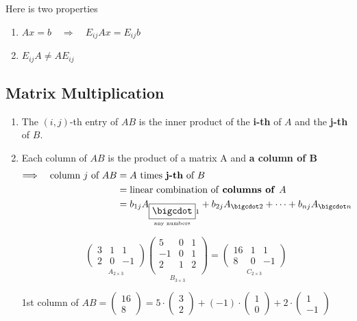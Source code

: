 \begin{note}
Here is two properties
    \begin{enumerate}
        \item $Ax=b \quad \Longrightarrow \quad E_{ij} Ax = E_{ij} b$
        \item $E_{ij}A \neq AE_{ij}$
    \end{enumerate}
\end{note}

\subsection{Matrix Multiplication}
\begin{enumerate}[label=(\arabic*)]
    \item The $(i, j)$-th entry of $AB$ is the inner product of the \textbf{i-th} of $A$ and the \textbf{j-th} of $B$.

    \item Each column of $AB$ is the product of a matrix A and \textbf{a column of B}
    \begin{align*}
        \Longrightarrow \quad \text{column}\ j \ \text{of } AB &= A \text{ times \textbf{j-th} of }B \\
        &= \text{linear combination of \textbf{columns of }}A\\
        &= b_{1j}A_{\underset{\text{any numbers}}{\boxed{\bigcdot}}1} + b_{2j}A_{\bigcdot2} + \cdots + b_{nj}A_{\bigcdot n}
    \end{align*}
    \begin{eg}
    \[
    \underset{A_{2\times3}}{\left(
    \begin{matrix}
    3 & 1 & 1 \\
    2 & 0 & -1
    \end{matrix}
    \right)}\underset{B_{3\times3}}{\left(
    \begin{matrix}
    5 & 0 & 1 \\
    -1 & 0 & 1 \\
    2 & 1 & 2 \\
    \end{matrix}
    \right)} = \underset{C_{2\times3}}{\left(
    \begin{matrix}
    16 & 1 & 1 \\
    8 & 0 & -1
    \end{matrix}
    \right)}
    \]
    
    
    \end{eg}
    1st column of $AB = \left(
    \begin{matrix}
    16 \\ 8
    \end{matrix}
    \right) = 5\cdot\left(
    \begin{matrix}
    3 \\ 2
    \end{matrix}
    \right)+(-1)\cdot\left(
    \begin{matrix}
    1 \\ 0
    \end{matrix}
    \right)+2\cdot\left(
    \begin{matrix}
    1 \\ -1
    \end{matrix}
    \right)$ 


\end{enumerate}

